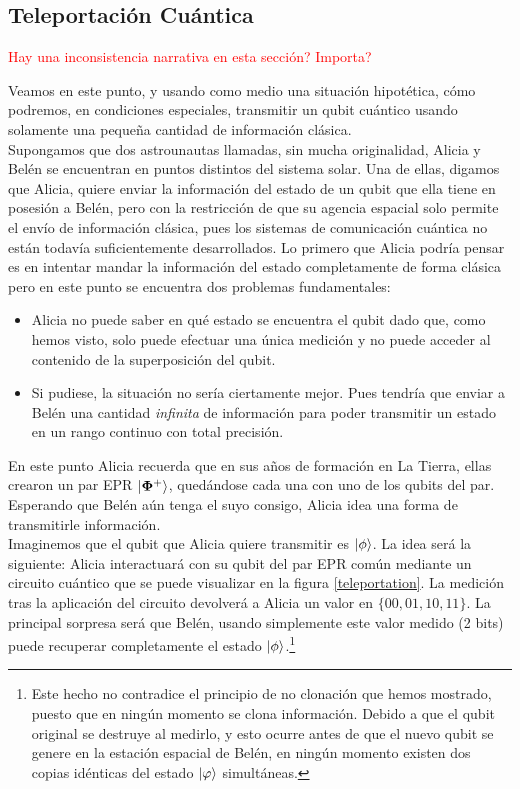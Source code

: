 \documentclass[11pt, spanish]{report}
\newcommand{\red}[1]{\textcolor{red}{#1}}
\numberwithin{equation}{section}
\numberwithin{defin}{section}
\begin{document}
\begin{appendices}
\section{Teleportación Cuántica}\label{sdc}

\begin{center}
\red{Hay una inconsistencia narrativa en esta sección? Importa?}
\end{center}

Veamos en este punto, y usando como medio una situación hipotética, cómo podremos, en condiciones especiales, transmitir un qubit cuántico usando solamente una pequeña cantidad de información clásica.\\

Supongamos que dos astrounautas llamadas, sin mucha originalidad, Alicia y Belén se encuentran en puntos distintos del sistema solar. Una de ellas, digamos que Alicia, quiere enviar la información del estado de un qubit que ella tiene en posesión a Belén, pero con la restricción de que su agencia espacial solo permite el envío de información clásica, pues los sistemas de comunicación cuántica no están todavía suficientemente desarrollados. Lo primero que Alicia podría pensar es en intentar mandar la información del estado completamente de forma clásica pero en este punto se encuentra dos problemas fundamentales:
\begin{itemize}
\item Alicia no puede saber en qué estado se encuentra el qubit dado que, como hemos visto, solo puede efectuar una única medición y no puede acceder al contenido de la superposición del qubit.
\item Si pudiese, la situación no sería ciertamente mejor. Pues tendría que enviar a Belén una cantidad \emph{infinita} de información para poder transmitir un estado en un rango continuo con total precisión.
\end{itemize}

En este punto Alicia recuerda que en sus años de formación en La Tierra, ellas crearon un par EPR $\ket{\mathbf{\Phi}^+}$, quedándose cada una con uno de los qubits del par. Esperando que Belén aún tenga el suyo consigo, Alicia idea una forma de transmitirle información.\\

Imaginemos que el qubit que Alicia quiere transmitir es $\ket{\phi}$. La idea será la siguiente: Alicia interactuará con su qubit del par EPR común mediante un circuito cuántico que se puede visualizar en la figura \ref{teleportation}. La medición tras la aplicación del circuito devolverá a Alicia un valor en $\{00,01,10,11\}$. La principal sorpresa será que Belén, usando simplemente este valor medido (2 bits) puede recuperar completamente el estado $\ket{\phi}$.\footnote{Este hecho no contradice el principio de no clonación que hemos mostrado, puesto que en ningún momento se clona información. Debido a que el qubit original se destruye al medirlo, y esto ocurre antes de que el nuevo qubit se genere en la estación espacial de Belén, en ningún momento existen dos copias idénticas del estado $\ket{\varphi}$ simultáneas.}\\


\end{appendices}
\end{document}
